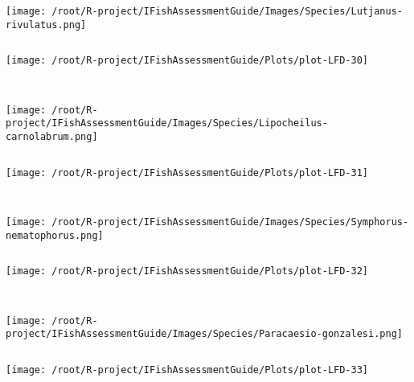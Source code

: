 \begin{knitrout}
\begin{kframe}
\begin{verbatim}
\end{verbatim}
\end{kframe}
\texttt{[image: /root/R-project/IFishAssessmentGuide/Images/Species/Lutjanus-rivulatus.png]}
\begin{kframe}\begin{verbatim}
\end{verbatim}
\end{kframe}
\texttt{[image: /root/R-project/IFishAssessmentGuide/Plots/plot-LFD-30]} 
\begin{kframe}\begin{verbatim}
 
\end{verbatim}
\end{kframe}
\texttt{[image: /root/R-project/IFishAssessmentGuide/Images/Species/Lipocheilus-carnolabrum.png]}
\begin{kframe}\begin{verbatim}
\end{verbatim}
\end{kframe}
\texttt{[image: /root/R-project/IFishAssessmentGuide/Plots/plot-LFD-31]} 
\begin{kframe}\begin{verbatim}
 
\end{verbatim}
\end{kframe}
\texttt{[image: /root/R-project/IFishAssessmentGuide/Images/Species/Symphorus-nematophorus.png]}
\begin{kframe}\begin{verbatim}
\end{verbatim}
\end{kframe}
\texttt{[image: /root/R-project/IFishAssessmentGuide/Plots/plot-LFD-32]} 
\begin{kframe}\begin{verbatim}
 
\end{verbatim}
\end{kframe}
\texttt{[image: /root/R-project/IFishAssessmentGuide/Images/Species/Paracaesio-gonzalesi.png]}
\begin{kframe}\begin{verbatim}
\end{verbatim}
\end{kframe}
\texttt{[image: /root/R-project/IFishAssessmentGuide/Plots/plot-LFD-33]} 
\begin{kframe}\begin{verbatim}
 

\end{verbatim}
\end{kframe}
\end{knitrout}

